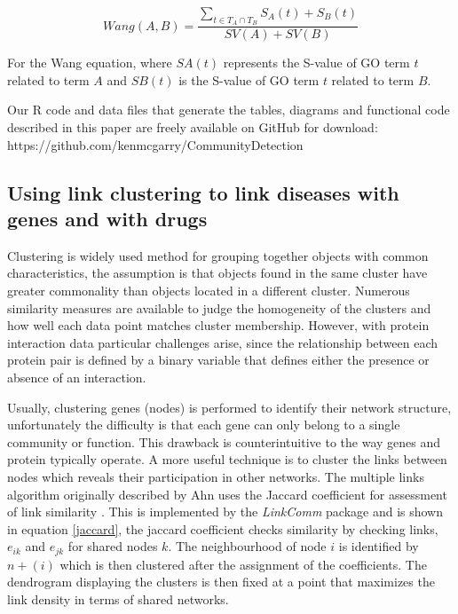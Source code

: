 \documentclass[a4paper,8pt,twocolumn,5p]{elsarticle}
\begin{document}
\begin{equation}
         Wang(A, B) = \frac{\displaystyle\sum_{t \in T_{A} \cap T_{B}}{S_{A}(t) + S_{B}(t)}}{SV(A) + SV(B)}
\label{goe}
\end{equation}

For the Wang equation, where $SA(t)$ represents the S-value of GO term $t$ related to term $A$ and $SB(t)$ is the S-value of GO term $t$ related to term $B$. 

Our R code and data files that generate the tables, diagrams and functional code described in this paper are freely available on GitHub for download: \\https://github.com/kenmcgarry/CommunityDetection

\subsection{Using link clustering to link diseases with genes and with drugs}
Clustering is widely used method for grouping together objects with common characteristics, the assumption is that objects found in the same cluster have greater commonality than objects located in a different cluster.  Numerous similarity measures are available to judge the homogeneity of the clusters and how well each data point matches cluster membership. However, with protein interaction data particular challenges arise, since the relationship between each protein pair is defined by a binary variable that defines either the presence or absence of an interaction.

Usually, clustering genes (nodes) is performed to identify their network structure, unfortunately the difficulty is that each gene can only belong to a single community or function. This drawback is counterintuitive to the way genes and  protein typically operate. A more useful technique is to cluster the links between nodes which reveals their participation in other networks. The multiple links algorithm originally described by Ahn uses the Jaccard coefficient for assessment of link similarity \cite{Ahn2010}. This is implemented by the \emph{LinkComm} package \cite{Kalinka2011} and is shown in equation \ref{jaccard}, the jaccard coefficient checks similarity by checking links, $e_{ik}$ and $e_{jk}$ for shared nodes $k$. The neighbourhood of node $i$ is identified by $n+(i)$ which is then clustered after the assignment of the coefficients. The dendrogram displaying the clusters is then fixed at a point that maximizes the link density in terms of shared networks.
\end{document}
